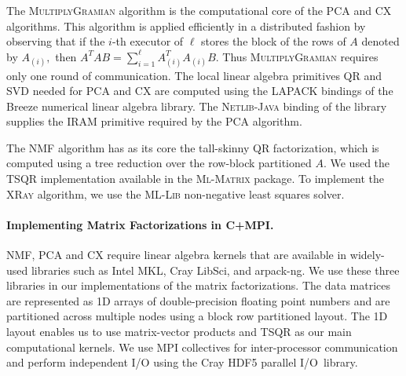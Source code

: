 The \textsc{MultiplyGramian} algorithm is the computational core of the PCA and CX algorithms.
This algorithm is applied efficiently in a distributed fashion by observing that if the $i$-th executor of $\ell$ stores the block of the rows of $A$ denoted by $A_{(i)},$ then $A^TA B = \sum_{i=1}^\ell A_{(i)}^T A_{(i)} B.$ Thus \textsc{MultiplyGramian} requires only one round of communication.  The local linear algebra primitives \textsc{QR} and \textsc{SVD} needed for PCA and CX are computed using the \textsc{LAPACK} bindings of the Breeze numerical linear algebra library.  The \textsc{Netlib-Java} binding of the  library supplies the \textsc{IRAM} primitive required by the PCA algorithm. 

The NMF algorithm has as its core the tall-skinny QR factorization, which is computed using a tree reduction over the row-block partitioned $A$.
We used the \textsc{TSQR} implementation available in the \textsc{Ml-Matrix} package. To implement the \textsc{XRay} algorithm, we use the \textsc{ML-Lib} non-negative least squares solver.


\paragraph{Implementing Matrix Factorizations in C+MPI.}
NMF, PCA and CX require linear algebra kernels that are available in widely-used libraries such as Intel MKL, Cray LibSci, and arpack-ng. We use these three libraries in our implementations of the matrix factorizations. The data matrices are represented as 1D arrays of double-precision floating point numbers and are partitioned across multiple nodes using a block row partitioned layout. The 1D layout enables us to use matrix-vector products and TSQR as our main computational kernels. We use MPI collectives for inter-processor communication and perform independent I/O using the Cray HDF5 parallel I/O~library.  
